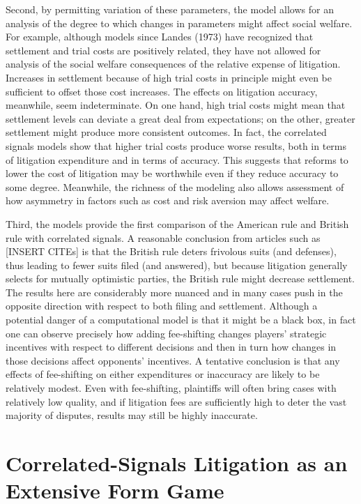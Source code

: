 \documentclass{article}
\begin{document}
Second, by permitting variation of these parameters, the model allows for an analysis of the degree to which changes in parameters might affect social welfare. For example, although models since Landes (1973) have recognized that settlement and trial costs are positively related, they have not allowed for analysis of the social welfare consequences of the relative expense of litigation. Increases in settlement because of high trial costs in principle might even be sufficient to offset those cost increases. The effects on litigation accuracy, meanwhile, seem indeterminate. On one hand, high trial costs might mean that settlement levels can deviate a great deal from expectations; on the other, greater settlement might produce more consistent outcomes. In fact, the correlated signals models show that higher trial costs produce worse results, both in terms of litigation expenditure and in terms of accuracy. This suggests that reforms to lower the cost of litigation may be worthwhile even if they reduce accuracy to some degree. Meanwhile, the richness of the modeling also allows assessment of how asymmetry in factors such as cost and risk aversion may affect welfare. 

Third, the models provide the first comparison of the American rule and British rule with correlated signals. A reasonable conclusion from articles such as [INSERT CITEs] is that the British rule deters frivolous suits (and defenses), thus leading to fewer suits filed (and answered), but because litigation generally selects for mutually optimistic parties, the British rule might decrease settlement. The results here are considerably more nuanced and in many cases push in the opposite direction with respect to both filing and settlement. Although a potential danger of a computational model is that it might be a black box, in fact one can observe precisely how adding fee-shifting changes players' strategic incentives with respect to different decisions and then in turn how changes in those decisions affect opponents' incentives. A tentative conclusion is that any effects of fee-shifting on either expenditures or inaccuracy are likely to be relatively modest. Even with fee-shifting, plaintiffs will often bring cases with relatively low quality, and if litigation fees are sufficiently high to deter the vast majority of disputes, results may still be highly inaccurate. 

\section{Correlated-Signals Litigation as an Extensive Form Game}
\end{document}

